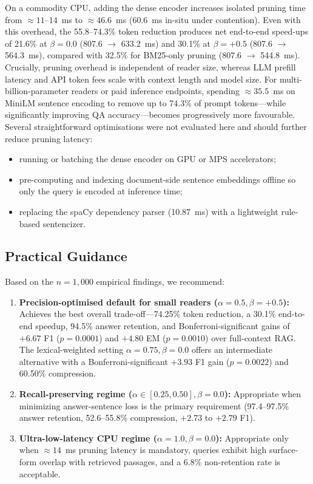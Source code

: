 \documentclass[conference]{IEEEtran}
\begin{document}
On a commodity CPU, adding the dense encoder increases isolated pruning time from $\approx 11\text{--}14$~ms to $\approx 46.6$~ms (60.6~ms in-situ under contention). Even with this overhead, the 55.8--74.3\% token reduction produces net end-to-end speed-ups of 21.6\% at $\beta = 0.0$ (807.6 $\rightarrow$ 633.2~ms) and 30.1\% at $\beta = +0.5$ (807.6 $\rightarrow$ 564.3~ms), compared with 32.5\% for BM25-only pruning (807.6 $\rightarrow$ 544.8~ms). Crucially, pruning overhead is independent of reader size, whereas LLM prefill latency and API token fees scale with context length and model size. For multi-billion-parameter readers or paid inference endpoints, spending $\approx 35.5$~ms on MiniLM sentence encoding to remove up to 74.3\% of prompt tokens---while significantly improving QA accuracy---becomes progressively more favourable. Several straightforward optimisations were not evaluated here and should further reduce pruning latency:
\begin{itemize}
    \item running or batching the dense encoder on GPU or MPS accelerators;
    \item pre-computing and indexing document-side sentence embeddings offline so only the query is encoded at inference time;
    \item replacing the spaCy dependency parser (10.87~ms) with a lightweight rule-based sentencizer.
\end{itemize}

\subsection{Practical Guidance}

Based on the $n = 1,000$ empirical findings, we recommend:
\begin{enumerate}
    \item \textbf{Precision-optimised default for small readers ($\alpha = 0.5, \beta = +0.5$):} Achieves the best overall trade-off---74.25\% token reduction, a 30.1\% end-to-end speedup, 94.5\% answer retention, and Bonferroni-significant gains of $+6.67$ F1 ($p = 0.0001$) and $+4.80$ EM ($p = 0.0010$) over full-context RAG. The lexical-weighted setting $\alpha = 0.75, \beta = 0.0$ offers an intermediate alternative with a Bonferroni-significant $+3.93$ F1 gain ($p = 0.0022$) and 60.50\% compression.
    \item \textbf{Recall-preserving regime ($\alpha \in [0.25, 0.50], \beta = 0.0$):} Appropriate when minimizing answer-sentence loss is the primary requirement (97.4--97.5\% answer retention, 52.6--55.8\% compression, $+2.73$ to $+2.79$ F1).
    \item \textbf{Ultra-low-latency CPU regime ($\alpha = 1.0, \beta = 0.0$):} Appropriate only when $\approx 14$~ms pruning latency is mandatory, queries exhibit high surface-form overlap with retrieved passages, and a 6.8\% non-retention rate is acceptable.
\end{enumerate}
\end{document}
